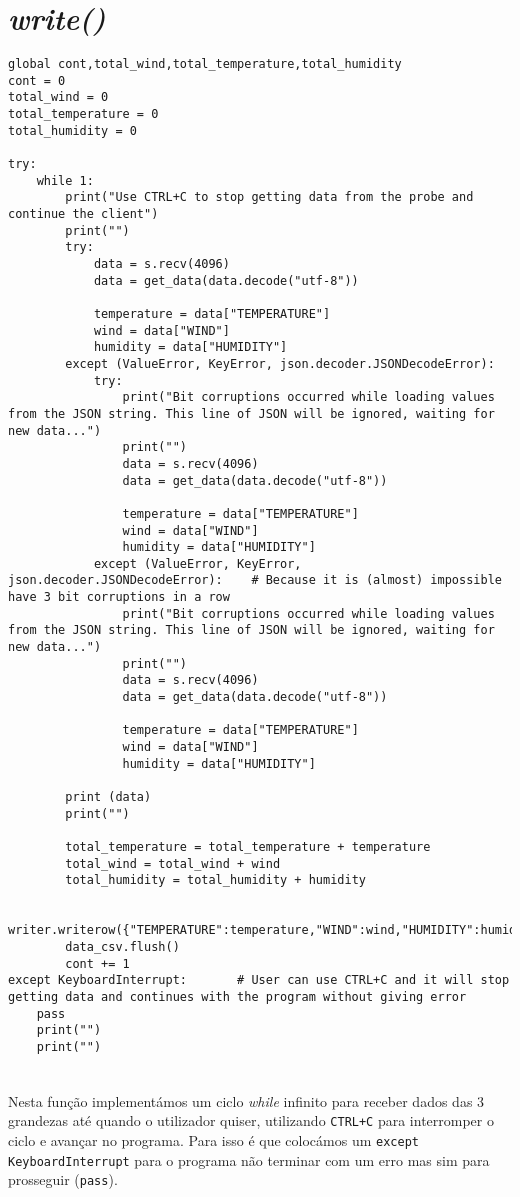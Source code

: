 \documentclass[a4paper]{report}
\begin{document}
\newpage

\section{\textit{write()}}
\begin{lstlisting}
global cont,total_wind,total_temperature,total_humidity
cont = 0
total_wind = 0
total_temperature = 0
total_humidity = 0
	
try:
	while 1:
		print("Use CTRL+C to stop getting data from the probe and continue the client")
		print("")
		try:
			data = s.recv(4096)
			data = get_data(data.decode("utf-8"))
				
			temperature = data["TEMPERATURE"]
			wind = data["WIND"]
			humidity = data["HUMIDITY"]
		except (ValueError, KeyError, json.decoder.JSONDecodeError):
			try:
				print("Bit corruptions occurred while loading values from the JSON string. This line of JSON will be ignored, waiting for new data...")
				print("")
				data = s.recv(4096)
				data = get_data(data.decode("utf-8"))
					
				temperature = data["TEMPERATURE"]
				wind = data["WIND"]
				humidity = data["HUMIDITY"]
			except (ValueError, KeyError, json.decoder.JSONDecodeError):	# Because it is (almost) impossible have 3 bit corruptions in a row
				print("Bit corruptions occurred while loading values from the JSON string. This line of JSON will be ignored, waiting for new data...")
				print("")
				data = s.recv(4096)
				data = get_data(data.decode("utf-8"))
					
				temperature = data["TEMPERATURE"]
				wind = data["WIND"]
				humidity = data["HUMIDITY"]
			
		print (data)
		print("")
				 
		total_temperature = total_temperature + temperature
		total_wind = total_wind + wind
		total_humidity = total_humidity + humidity
			
		writer.writerow({"TEMPERATURE":temperature,"WIND":wind,"HUMIDITY":humidity})
		data_csv.flush()
		cont += 1
except KeyboardInterrupt:		# User can use CTRL+C and it will stop getting data and continues with the program without giving error
	pass
	print("")
	print("")
		
\end{lstlisting}
\paragraph{}Nesta função implementámos um ciclo \textit{while} infinito para receber dados das 3 grandezas até quando o utilizador quiser, utilizando \texttt{CTRL+C} para interromper o ciclo e avançar no programa. Para isso é que colocámos um \texttt{except KeyboardInterrupt} para o programa não terminar com um erro mas sim para prosseguir (\texttt{pass}).
\end{document}

